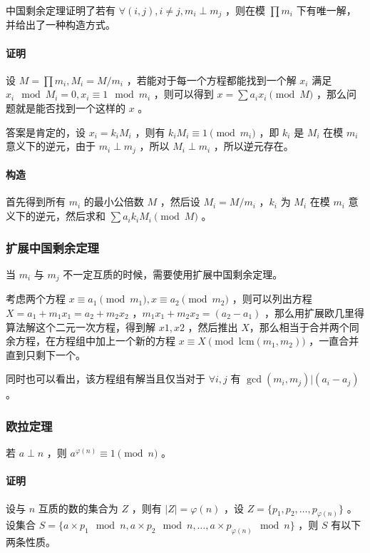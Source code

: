 \documentclass[UTF-8]{ctexart}
\begin{document}
	中国剩余定理证明了若有 $\forall (i,j) ,i \neq j,m _ i \perp m _ j$ ，则在模 $\prod m _ i$ 下有唯一解，并给出了一种构造方式。
	
	\paragraph{证明}设 $M=\prod m _ i,M _ i=M/m _ i$ ，若能对于每一个方程都能找到一个解 $x _ i$ 满足 $x _ i \mod M _ i=0,x _ i \equiv 1 \mod{m _ i }$ ，则可以得到 $x = \sum a _ i x _ i \pmod M$ ，那么问题就是能否找到一个这样的 $x$ 。  
	
	答案是肯定的，设 $x _ i=k _ i M _ i$ ，则有 $k _ i M _ i \equiv 1 \pmod {m_i}$ ，即 $k _ i$ 是 $M _ i$ 在模 $m _ i$ 意义下的逆元，由于 $m _ i \perp m _ j$ ，所以 $M _ i \perp m _ i$ ，所以逆元存在。
	
	\paragraph{构造}首先得到所有 $m _ i$ 的最小公倍数 $M$ ，然后设 $M _ i =M/m _ i$ ，$k _ i$ 为 $M _ i$ 在模 $m _ i$ 意义下的逆元，然后求和 $\sum a _ i k _ i M _ i \pmod M $ 。
	
	\subsubsection{扩展中国剩余定理}
	当 $m _ i$ 与 $m _  j$ 不一定互质的时候，需要使用扩展中国剩余定理。
	
	考虑两个方程 $x \equiv a _ 1 \pmod{m _ 1},x \equiv a _ 2 \pmod{m _ 2}$ ，则可以列出方程 $X=a _ 1+m _ 1x _ 1=a _ 2+m _ 2 x _ 2$ ，$m _ 1 x _ 1+m _ 2 x _ 2=(a _ 2-a _ 1)$ ，那么用扩展欧几里得算法解这个二元一次方程，得到解 $x1,x2$ ，然后推出 $X$，那么相当于合并两个同余方程，在方程组中加上一个新的方程 $x \equiv X \pmod{\mbox{lcm}(m _ 1,m _ 2)}$ ，一直合并直到只剩下一个。  
	
	同时也可以看出，该方程组有解当且仅当对于 $\forall i,j$ 有 $\gcd(m _ i,m _ j)|(a _ i-a _ j)$ 。
	\subsubsection{欧拉定理}
	若 $a \perp n$ ，则 $a^{\varphi(n)} \equiv 1\pmod{n}$ 。
	  
	\paragraph{证明}
	
	设与 $n$ 互质的数的集合为 $Z$ ，则有 $|Z|=\varphi(n)$ ，设 $Z=\lbrace p _ 1,p _ 2,\dots,p _ {\varphi(n)}\rbrace$ 。设集合 $S=\lbrace a \times p _ 1 \mod{n},a \times p _ 2 \mod{n},\dots,a \times p _ {\varphi(n)} \mod{n} \rbrace$ ，则 $S$ 有以下两条性质。
	
\end{document}
